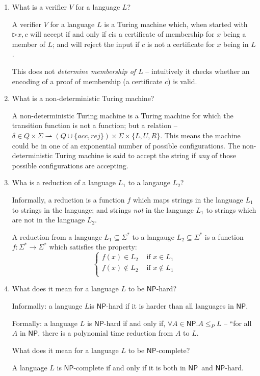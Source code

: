 \documentclass[10pt,\jkfside,a4paper]{article}
\newcommand{\NP}{\ensuremath{\mathsf{NP}}}
\begin{document}
\begin{enumerate}
\item What is a verifier $V$ for a language $L$?

A verifier $V$ for a language $L$ is a Turing machine which, when started
with $\triangleright x,c$ will accept if and only if $c$is a certificate of
membership for $x$ being a member of $L$; and will reject the input if $c$
is not a certificate for $x$ being in $L$.

This does not \textit{determine membership of $L$} -- intuitively it checks
whether an encoding of a proof of membership (a certificate $c$) is valid.

\item What is a non-deterministic Turing machine?

A non-deterministic Turing machine is a Turing machine for which the
transition function is not a function; but a relation --
$\delta \in Q \times \Sigma \rightharpoonup (Q \cup \{acc, rej\}) \times
\Sigma \times \{L, U, R\}$. This means the machine could be in one of an
exponential number of possible configurations. The non-deterministic Turing
machine is said to accept the string if \textit{any} of those
possible configurations are accepting.

\item Wha is a reduction of a language $L_1$ to a langauge $L_2$?

Informally, a reduction is a function $f$ which maps strings in the language
$L_1$ to strings in the language; and strings \textit{not} in the language
$L_1$ to strings which are not in the language $L_2$.

A reduction from a language $L_1 \subseteq \Sigma^*$ to a langauge
$L_2 \subseteq \Sigma^*$ is a function $f: \Sigma^* \to \Sigma^*$ which
satisfies the property:
\[
\begin{cases}
f(x) \in L_2 & \text{ if } x \in L_1 \\
f(x) \notin L_2 & \text{ if } x \notin L_1 \\
\end{cases}
\]

\item What does it mean for a language $L$ to be \NP-hard?

Informally: a language $L$is \NP-hard if it is harder than all languages in
\NP.

Formally: a language $L$ is \NP-hard if and only if, $\forall A \in \NP. A
\le_P L$ -- ``for all $A$ in \NP, there is a polynomial time reduction from $A$
to $L$.

What does it mean for a language $L$ to be \NP-complete?

A language $L$ is \NP-complete if and only if it is both in \NP\ and \NP-hard.

\end{enumerate}
\end{document}

